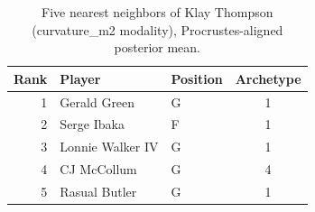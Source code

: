 \begin{table}[htbp]
  \centering\small
  \begin{tabular}{rllc}
    \toprule
    Rank & Player & Position & Archetype \\
    \midrule
    1 & Gerald Green & G & 1 \\
    2 & Serge Ibaka & F & 1 \\
    3 & Lonnie Walker IV & G & 1 \\
    4 & CJ McCollum & G & 4 \\
    5 & Rasual Butler & G & 1 \\
    \bottomrule
  \end{tabular}
  \caption{Five nearest neighbors of Klay Thompson (curvature_m2 modality), Procrustes-aligned posterior mean.}
  \label{tab:Klay_Thompson_neighbors_curvature_m2}
\end{table}

